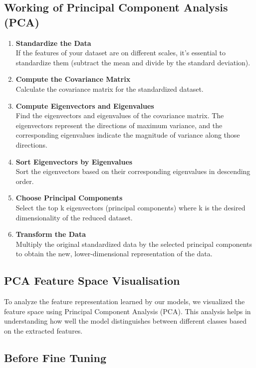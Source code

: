\subsection{Working of Principal Component Analysis (PCA)}
\begin{enumerate}
    \item \textbf{Standardize the Data}\\
    If the features of your dataset are on different scales, it’s essential to standardize them (subtract the mean and divide by the standard deviation).
    \item \textbf{Compute the Covariance Matrix}\\
        Calculate the covariance matrix for the standardized dataset. 
    \item \textbf{Compute Eigenvectors and Eigenvalues}\\
    Find the eigenvectors and eigenvalues of the covariance matrix. The eigenvectors represent the directions of maximum variance, and the corresponding eigenvalues indicate the magnitude of variance along those directions.
    \item \textbf{Sort Eigenvectors by Eigenvalues}\\
    Sort the eigenvectors based on their corresponding eigenvalues in descending order.
    \item \textbf{Choose Principal Components}\\
    Select the top k eigenvectors (principal components) where k is the desired dimensionality of the reduced dataset.
    \item \textbf{Transform the Data}\\
    Multiply the original standardized data by the selected principal components to obtain the new, lower-dimensional representation of the data.\cite{pca-1}
\end{enumerate}

\subsection{PCA Feature Space Visualisation}
To analyze the feature representation learned by our models, we visualized the feature space using Principal Component Analysis (PCA). This analysis helps in understanding how well the model distinguishes between different classes based on the extracted features.\par\vspace{1em}

\subsection{Before Fine Tuning}

